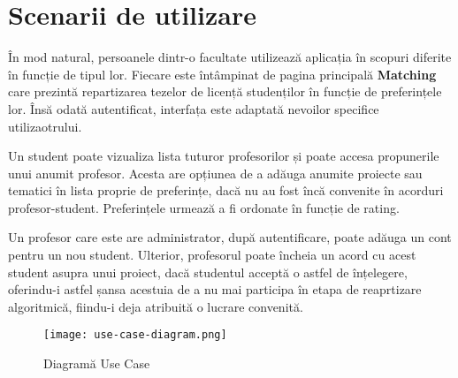\chapter{Scenarii de utilizare}

În mod natural, persoanele dintr-o facultate utilizează aplicația \thesistitle în scopuri diferite în funcție de tipul lor. Fiecare este întâmpinat de pagina principală \textbf{Matching} care prezintă repartizarea tezelor de licență studenților în funcție de preferințele lor. Însă odată autentificat, interfața este adaptată nevoilor specifice utilizaotrului.

Un student poate vizualiza lista tuturor profesorilor și poate accesa propunerile unui anumit profesor. Acesta are opțiunea de a adăuga anumite proiecte sau tematici în lista proprie de preferințe, dacă nu au fost încă convenite în acorduri profesor-student. Preferințele urmează a fi ordonate în funcție de rating.

Un profesor care este are administrator, după autentificare, poate adăuga un cont pentru un nou student. Ulterior, profesorul poate încheia un acord cu acest student asupra unui proiect, dacă studentul acceptă o astfel de înțelegere, oferindu-i astfel șansa acestuia de a nu mai participa în etapa de reaprtizare algoritmică, fiindu-i deja atribuită o lucrare convenită.

\begin{figure}[H]
	\centering
	\texttt{[image: use-case-diagram.png]}
	\caption{Diagramă Use Case}
\end{figure}